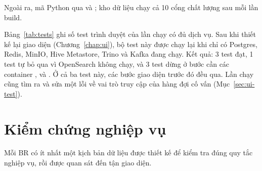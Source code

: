Ngoài ra, mã Python qua  và ; kho dữ liệu chạy cả 10 cổng chất lượng sau mỗi lần build.

Bảng~\ref{tab:tests} ghi số test trình duyệt của lần chạy có đủ dịch vụ. Sau khi thiết kế lại giao diện (Chương~\ref{chap:ui}), bộ test này được chạy lại khi chỉ có Postgres, Redis, MinIO, Hive Metastore, Trino và Kafka đang chạy. Kết quả: 3 test đạt, 1 test tự bỏ qua vì OpenSearch không chạy, và 3 test dừng ở bước cần các container ,  và . Ở cả ba test này, các bước giao diện trước đó đều qua. Lần chạy cũng tìm ra và sửa một lỗi về vai trò truy cập của hàng đợi cố vấn (Mục~\ref{sec:ui-test}).

\section{Kiểm chứng nghiệp vụ}

Mỗi BR có ít nhất một kịch bản dữ liệu được thiết kế để kiểm tra đúng quy tắc nghiệp vụ, rồi được quan sát đến tận giao diện.

